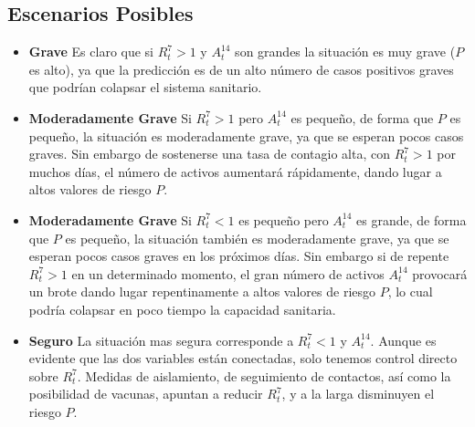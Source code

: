 \documentclass[12pt,a4paper]{article}
\begin{document}
\subsection*{Escenarios Posibles}

\begin{itemize}
\item {\bf Grave} Es claro que si $R^7_t>1$ y $A^{14}_t$ son grandes 
la situación es muy grave ($P$ es alto), ya que la predicción es de un alto número 
de casos positivos graves que podrían colapsar el sistema sanitario.

\item {\bf Moderadamente Grave} Si $R^7_t>1$ pero 
$A^{14}_t$ es pequeño, de forma que $P$ es pequeño, 
la situación es moderadamente grave, ya que se esperan 
pocos casos graves. Sin embargo de sostenerse una tasa de contagio alta, 
con $R^7_t>1$ por muchos días, el n\'umero de
activos aumentará rápidamente, dando lugar a altos valores 
de riesgo $P$. 

\item {\bf Moderadamente Grave} Si $R^7_t<1$ es pequeño pero 
$A^{14}_t$ es grande, de forma que $P$ es pequeño, la situación 
también es moderadamente grave, ya que se esperan 
pocos casos graves en los próximos días. 
Sin embargo si de repente $R^7_t>1$ en un determinado momento, el gran número de activos 
$A^{14}_t$ provocará un brote dando lugar repentinamente 
a altos valores de riesgo $P$, lo cual podría colapsar en poco tiempo 
la capacidad sanitaria.

\item {\bf Seguro}  La situación mas segura corresponde a 
$R^7_t<1$ y $A^{14}_t$. Aunque es evidente que las dos 
variables están conectadas, solo tenemos control 
directo sobre $R^7_t$. Medidas de aislamiento, 
de seguimiento de contactos, así como la posibilidad de vacunas, 
apuntan a reducir $R^7_t$, y a la larga disminuyen el riesgo $P$. 
\end{itemize}
\end{document}
